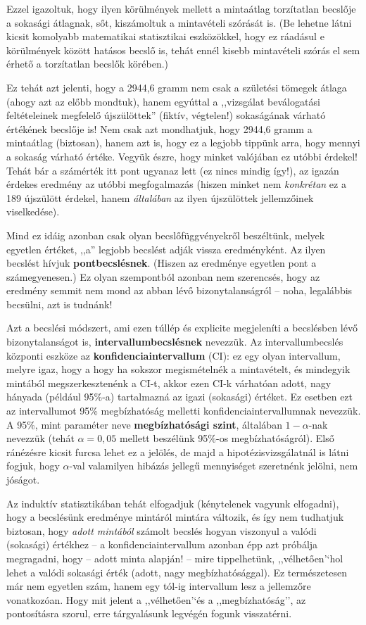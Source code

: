 \documentclass[]{book}
\begin{document}
Ezzel igazoltuk, hogy ilyen körülmények mellett a mintaátlag torzítatlan
becslője a sokasági átlagnak, sőt, kiszámoltuk a mintavételi szórását
is. (Be lehetne látni kicsit komolyabb matematikai statisztikai
eszközökkel, hogy ez ráadásul e körülmények között hatásos becslő is,
tehát ennél kisebb mintavételi szórás el sem érhető a torzítatlan
becslők körében.)

Ez tehát azt jelenti, hogy a 2944,6 gramm nem csak a születési tömegek
átlaga (ahogy azt az előbb mondtuk), hanem egyúttal a ,,vizsgálat
beválogatási feltételeinek megfelelő újszülöttek'' (fiktív, végtelen!)
sokaságának várható értékének becslője is! Nem csak azt mondhatjuk, hogy
2944,6 gramm a mintaátlag (biztosan), hanem azt is, hogy ez a legjobb
tippünk arra, hogy mennyi a sokaság várható értéke. Vegyük észre, hogy
minket valójában ez utóbbi érdekel! Tehát bár a számérték itt pont
ugyanaz lett (ez nincs mindig így!), az igazán érdekes eredmény az
utóbbi megfogalmazás (hiszen minket nem \emph{konkrétan} ez a 189
újszülött érdekel, hanem \emph{általában} az ilyen újszülöttek
jellemzőinek viselkedése).

Mind ez idáig azonban csak olyan becslőfüggvényekről beszéltünk, melyek
egyetlen értéket, ,,a'' legjobb becslést adják vissza eredményként. Az
ilyen becslést hívjuk \textbf{pontbecslésnek}. (Hiszen az eredménye
egyetlen pont a számegyenesen.) Ez olyan szempontból azonban nem
szerencsés, hogy az eredmény semmit nem mond az abban lévő
bizonytalanságról -- noha, legalábbis becsülni, azt is tudnánk!

Azt a becslési módszert, ami ezen túllép és explicite megjeleníti a
becslésben lévő bizonytalanságot is, \textbf{intervallumbecslésnek}
nevezzük. Az intervallumbecslés központi eszköze az
\textbf{konfidenciaintervallum} (CI): ez egy olyan intervallum, melyre
igaz, hogy a hogy ha sokszor megismételnék a mintavételt, és mindegyik
mintából megszerkesztenénk a CI-t, akkor ezen CI-k várhatóan adott, nagy
hányada (például 95\%-a) tartalmazná az igazi (sokasági) értéket. Ez
esetben ezt az intervallumot 95\% megbízhatóság melletti
konfidenciaintervallumnak nevezzük. A 95\%, mint paraméter neve
\textbf{megbízhatósági szint}, általában \(1-\alpha\)-nak nevezzük
(tehát \(\alpha=0,\!05\) mellett beszélünk 95\%-os megbízhatóságról).
Első ránézésre kicsit furcsa lehet ez a jelölés, de majd a
hipotézisvizsgálatnál is látni fogjuk, hogy \(\alpha\)-val valamilyen
hibázás jellegű mennyiséget szeretnénk jelölni, nem jóságot.

Az induktív statisztikában tehát elfogadjuk (kénytelenek vagyunk
elfogadni), hogy a becslésünk eredménye mintáról mintára változik, és
így nem tudhatjuk biztosan, hogy \emph{adott mintából} számolt becslés
hogyan viszonyul a valódi (sokasági) értékhez -- a
konfidenciaintervallum azonban épp azt próbálja megragadni, hogy --
adott minta alapján! -- mire tippelhetünk, ,,vélhetően'`hol lehet a
valódi sokasági érték (adott, nagy megbízhatósággal). Ez természetesen
már nem egyetlen szám, hanem egy tól-ig intervallum lesz a jellemzőre
vonatkozóan. Hogy mit jelent a ,,vélhetően'`és a ,,megbízhatóság'', az
pontosításra szorul, erre tárgyalásunk legvégén fogunk visszatérni.
\end{document}
